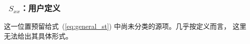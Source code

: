 \vsssub
\subsubsection{~$S_{xx}$：用户定义} \label{sec:XXx}
\vsssub


\noindent
这一位置预留给式~(\ref{eq:general_st}) 中尚未分类的源项。几乎按定义而言，
这里无法给出其具体形式。
